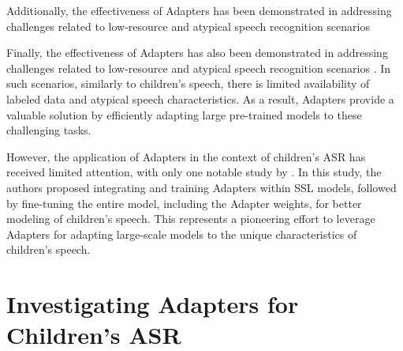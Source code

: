 Additionally, the effectiveness of Adapters has been demonstrated in addressing challenges related to low-resource and atypical speech recognition scenarios \cite{tomanek2021residual}

Finally, the effectiveness of Adapters has also been demonstrated in addressing challenges related to low-resource and atypical speech recognition scenarios \cite{tomanek2021residual}. In such scenarios, similarly to children's speech, there is limited availability of labeled data and atypical speech characteristics. As a result, Adapters provide a valuable solution by efficiently adapting large pre-trained models to these challenging tasks. 

However, the application of Adapters in the context of children's \ac{ASR} has received limited attention, with only one notable study by \cite{fan2022draft}. In this study, the authors proposed integrating and training Adapters within \ac{SSL} models, followed by fine-tuning the entire model, including the Adapter weights, for better modeling of children's speech. This represents a pioneering effort to leverage Adapters for adapting large-scale models to the unique characteristics of children's speech.

\section{Investigating Adapters for Children's ASR}

